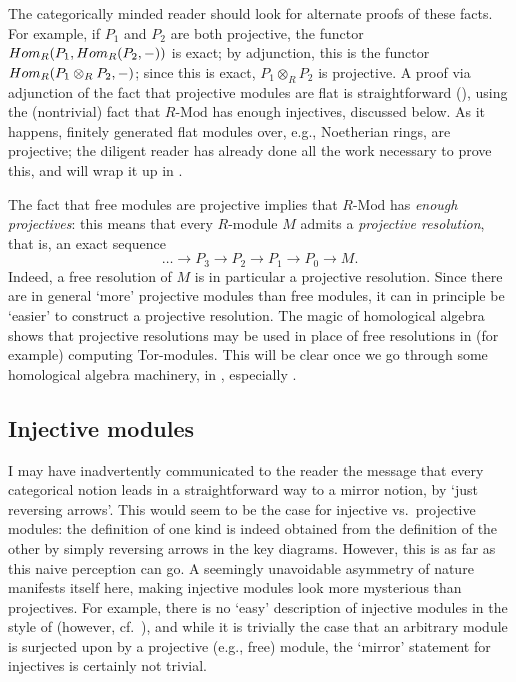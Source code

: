 The categorically minded reader should look for alternate proofs of
these facts. For example, if $P_1$ and $P_2$ are both projective, the
functor $Hom_R(P_1, Hom_R(P_2, -))$ is exact; by adjunction, this is
the functor $Hom_R(P_1 \otimes_R P_2, -)$; since this is exact,
$P_1 \otimes_R P_2$ is projective. A proof via adjunction of the fact
that projective modules are flat is straightforward
(), using
the (nontrivial) fact that $R\text{-Mod}$ has enough injectives,
discussed below. As it happens, finitely generated flat modules over,
e.g., Noetherian rings, are projective; the diligent reader has
already done all the work necessary to prove this, and will wrap it up
in
.

The fact that free modules are projective implies that $R\text{-Mod}$
has \emph{enough projectives}: this means that every $R$-module $M$
admits a \emph{projective resolution}, that is, an exact sequence
\[
  \dots \to P_3 \to P_2 \to P_1 \to P_0 \to M.
\]
Indeed, a free resolution of $M$ is in particular a projective
resolution. Since there are in general `more' projective modules than
free modules, it can in principle be `easier' to construct a
projective resolution. The magic of homological algebra shows that
projective resolutions may be used in place of free resolutions in
(for example) computing Tor-modules. This will be clear once we go
through some homological algebra machinery, in ,
especially .

\subsection{Injective modules}
\label{subsec:linrep:injective-modules}
I may have inadvertently communicated to the reader the message that
every categorical notion leads in a straightforward way to a mirror
notion, by `just reversing arrows'. This would seem to be the case for
injective vs.\ projective modules: the definition of one kind is
indeed obtained from the definition of the other by simply reversing
arrows in the key diagrams. However, this is as far as this naive
perception can go. A seemingly unavoidable asymmetry of nature
manifests itself here, making injective modules look more mysterious
than projectives. For example, there is no `easy' description of
injective modules in the style of 
(however, cf.\ ), and while it is trivially
the case that an arbitrary module is surjected upon by a projective
(e.g., free) module, the `mirror' statement for injectives is
certainly not trivial.

